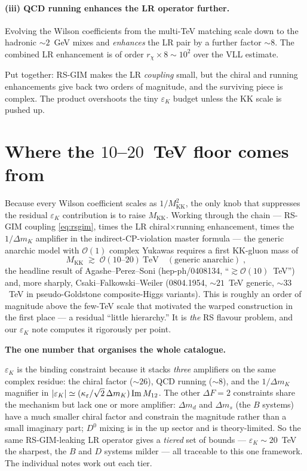 \documentclass[11pt]{article}
\newenvironment{callout}[1]{%
  \par\medskip\begin{shaded}\noindent\textbf{#1}\par\smallskip}{\end{shaded}\medskip}
\newcommand{\MKK}{M_{\mathrm{KK}}}
\newcommand{\eps}{\varepsilon}
\newcommand{\epsK}{\varepsilon_K}
\newcommand{\dmk}{\Delta m_K}
\theoremstyle{definition}
\begin{document}
\paragraph{(iii) QCD running enhances the LR operator further.} Evolving the
Wilson coefficients from the multi-TeV matching scale down to the hadronic
$\sim2$~GeV mixes and \emph{enhances} the LR pair by a further factor $\sim8$. The
combined LR enhancement is of order $r_\chi\times8\sim10^2$ over the VLL estimate.

\noindent Put together: RS-GIM makes the LR \emph{coupling} small, but the chiral
and running enhancements give back two orders of magnitude, and the surviving
piece is complex. The product overshoots the tiny $\epsK$ budget unless the KK
scale is pushed up.

\section{Where the $10$--$20$~TeV floor comes from}
\label{sec:floor}

Because every Wilson coefficient scales as $1/\MKK^2$, the only knob that
suppresses the residual $\epsK$ contribution is to raise $\MKK$. Working through
the chain --- RS-GIM coupling \eqref{eq:rsgim}, times the LR chiral$\times$running
enhancement, times the $1/\dmk$ amplifier in the indirect-CP-violation master
formula --- the generic anarchic model with $\mathcal{O}(1)$ complex Yukawas
requires a first KK-gluon mass of
\begin{equation}
\boxed{\;\MKK \;\gtrsim\; \mathcal{O}(10\text{--}20)~\text{TeV}\quad(\text{generic anarchic})\;,}
\label{eq:floor}
\end{equation}
the headline result of Agashe--Perez--Soni (hep-ph/0408134, ``$\gtrsim
\mathcal{O}(10)$~TeV'') and, more sharply, Csaki--Falkowski--Weiler (0804.1954,
$\sim21$~TeV generic, $\sim33$~TeV in pseudo-Goldstone composite-Higgs variants).
This is roughly an order of magnitude above the few-TeV scale that motivated the
warped construction in the first place --- a residual ``little hierarchy.'' It is
\emph{the} RS flavour problem, and our $\epsK$ note computes it rigorously per
point.

\begin{callout}{The one number that organises the whole catalogue.}
$\epsK$ is the binding constraint because it stacks \emph{three} amplifiers on the
same complex residue: the chiral factor ($\sim26$), QCD running ($\sim8$), and the
$1/\dmk$ magnifier in $|\epsK|\simeq(\kappa_\eps/\sqrt2\,\dmk)\,{\rm Im}\,M_{12}$.
The other $\Delta F=2$ constraints share the mechanism but lack one or more
amplifier: $\Delta m_d$ and $\Delta m_s$ (the $B$ systems) have a much smaller
chiral factor and constrain the magnitude rather than a small imaginary part;
$D^0$ mixing is in the up sector and is theory-limited. So the same RS-GIM-leaking
LR operator gives a \emph{tiered} set of bounds --- $\epsK\sim20$~TeV the
sharpest, the $B$ and $D$ systems milder --- all traceable to this one framework.
The individual notes work out each tier.
\end{callout}
\end{document}
